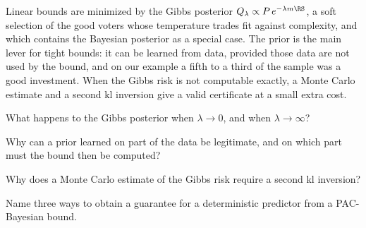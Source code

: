 \begin{keypoints}
Linear bounds are minimized by the Gibbs posterior $Q_\lambda\propto P\,e^{-\lambda m\RS}$,
a soft selection of the good voters whose temperature trades fit against
complexity, and which contains the Bayesian posterior as a special case. The
prior is the main lever for tight bounds: it can be learned from data, provided
those data are not used by the bound, and on our example a fifth to a third of the
sample was a good investment. When the Gibbs risk is not computable exactly, a
Monte Carlo estimate and a second kl inversion give a valid certificate at a
small extra cost.
\end{keypoints}

\begin{quickchecks}
\item What happens to the Gibbs posterior when $\lambda\to0$, and when $\lambda\to\infty$?
\item Why can a prior learned on part of the data be legitimate, and on which part must the bound then be computed?
\item Why does a Monte Carlo estimate of the Gibbs risk require a second kl inversion?
\item Name three ways to obtain a guarantee for a deterministic predictor from a PAC-Bayesian bound.
\end{quickchecks}

